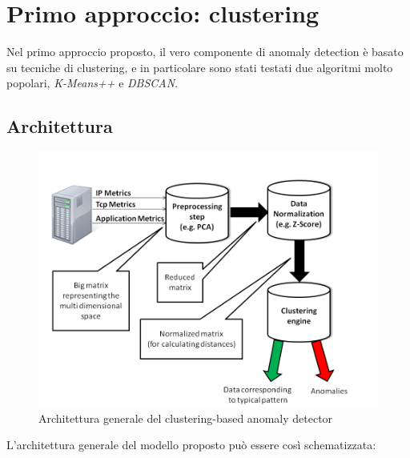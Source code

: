 \documentclass[12pt,a4paper,cucitura]{toptesi}
\begin{document}
\section{Primo approccio: clustering}

Nel primo approccio proposto, il vero componente di anomaly detection è basato su tecniche di clustering, e in particolare sono stati testati due algoritmi molto popolari, \emph{K-Means++} e \emph{DBSCAN}.

\subsection{Architettura}

\begin{figure}
\centering
\includegraphics[width=\textwidth]{clustering-architecture.png}
\caption{Architettura generale del clustering-based anomaly detector}
\end{figure}

L'architettura generale del modello proposto può essere così schematizzata:
\end{document}
